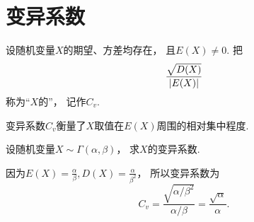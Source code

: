 \section{变异系数}
\begin{definition}
设随机变量\(X\)的期望、方差均存在，
且\(E(X) \neq 0\).
把\begin{equation*}
	\frac{\sqrt{D(X)}}{\abs{E(X)}}
\end{equation*}称为“\(X\)的”，
记作\(C_v\).
\end{definition}
变异系数\(C_v\)衡量了\(X\)取值在\(E(X)\)周围的相对集中程度.

\begin{example}
设随机变量\(X \sim \Gamma(\alpha,\beta)\)，
求\(X\)的变异系数.
\begin{solution}
因为\(E(X)=\frac\alpha\beta,
D(X)=\frac{\alpha}{\beta^2}\)，
所以变异系数为\begin{equation*}
	C_v = \frac{\sqrt{\alpha/\beta^2}}{\alpha/\beta}
	= \frac{\sqrt{\alpha}}{\alpha}.
\end{equation*}
\end{solution}
\end{example}
